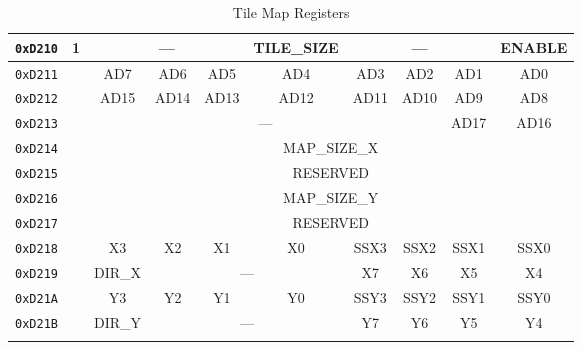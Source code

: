 \begin{table}[h]
\begin{center}
\begin{tabular}{|c|c|c|c|c|c|c|c|c|c|}
            \verb+0xD210+ & \multirow{11}{*}{1} & \multicolumn{3}{|c|}{---} & TILE\_SIZE & \multicolumn{3}{|c|}{---} & ENABLE \\ \hline
            \verb+0xD211+ & & AD7 & AD6 & AD5 & AD4 & AD3 & AD2 & AD1 & AD0 \\ \hline
            \verb+0xD212+ & & AD15 & AD14 & AD13 & AD12 & AD11 & AD10 & AD9 & AD8 \\ \hline
            \verb+0xD213+ & & \multicolumn{6}{|c|}{---} & AD17 & AD16 \\ \hline
            \verb+0xD214+ & & \multicolumn{8}{|c|}{MAP\_SIZE\_X} \\ \hline
            \verb+0xD215+ & & \multicolumn{8}{|c|}{RESERVED} \\ \hline
            \verb+0xD216+ & & \multicolumn{8}{|c|}{MAP\_SIZE\_Y} \\ \hline
            \verb+0xD217+ & & \multicolumn{8}{|c|}{RESERVED} \\ \hline
            \verb+0xD218+ & & X3 & X2 & X1 & X0 & SSX3 & SSX2 & SSX1 & SSX0 \\ \hline
            \verb+0xD219+ & & DIR\_X & \multicolumn{3}{|c|}{---} & X7 & X6 & X5 & X4 \\ \hline
            \verb+0xD21A+ & & Y3 & Y2 & Y1 & Y0 & SSY3 & SSY2 & SSY1 & SSY0 \\ \hline
            \verb+0xD21B+ & & DIR\_Y &\multicolumn{3}{|c|}{---} & Y7 & Y6 & Y5 & Y4 \\ \hline \\
        \end{tabular}
    \end{center}
    \caption{Tile Map Registers}
    \label{tab:tilemap_reg}
\end{table}
